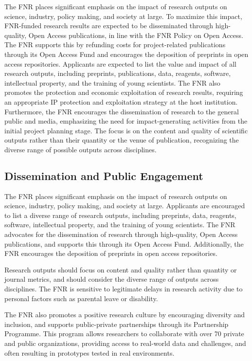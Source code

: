 \documentclass{article}
\begin{document}
The FNR places significant emphasis on the impact of research outputs on science, industry, policy making, and society at large. To maximize this impact, FNR-funded research results are expected to be disseminated through high-quality, Open Access publications, in line with the FNR Policy on Open Access. The FNR supports this by refunding costs for project-related publications through its Open Access Fund and encourages the deposition of preprints in open access repositories. Applicants are expected to list the value and impact of all research outputs, including preprints, publications, data, reagents, software, intellectual property, and the training of young scientists. The FNR also promotes the protection and economic exploitation of research results, requiring an appropriate IP protection and exploitation strategy at the host institution. Furthermore, the FNR encourages the dissemination of research to the general public and media, emphasizing the need for impact-generating activities from the initial project planning stage. The focus is on the content and quality of scientific outputs rather than their quantity or the venue of publication, recognizing the diverse range of possible outputs across disciplines.

\subsection{Dissemination and Public Engagement}

The FNR places significant emphasis on the impact of research outputs on science, industry, policy making, and society at large. Applicants are encouraged to list a diverse range of research outputs, including preprints, data, reagents, software, intellectual property, and the training of young scientists. The FNR advocates for the dissemination of research through high-quality, Open Access publications, and supports this through its Open Access Fund. Additionally, the FNR encourages the deposition of preprints in open access repositories.

Research outputs should focus on content and quality rather than quantity or journal metrics, and should consider the diverse range of outputs across disciplines. The FNR is sensitive to legitimate delays in research activity due to personal factors such as parental leave or disability.

The FNR also promotes a positive research culture by encouraging diversity and inclusion, and supports public-private partnerships through its Partnership Programme. This program allows researchers to collaborate with over 70 private and public organizations, providing access to real-world data and challenges, and often resulting in prototypes tested in real environments.
\end{document}
